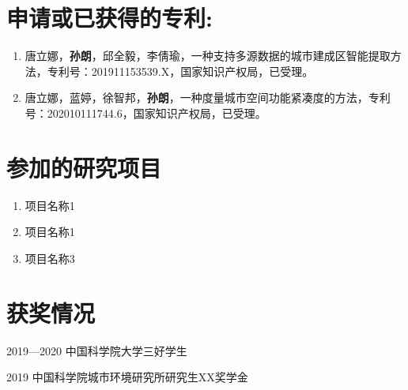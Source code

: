 \section*{申请或已获得的专利:}

{
\setlist[enumerate]{}%
\begin{enumerate}[nosep]
    \item 唐立娜，\textbf{孙朗}，邱全毅，李倩瑜，一种支持多源数据的城市建成区智能提取方法，专利号：201911153539.X，国家知识产权局，已受理。
    \item 唐立娜，蓝婷，徐智邦，\textbf{孙朗}，一种度量城市空间功能紧凑度的方法，专利号：202010111744.6，国家知识产权局，已受理。
\end{enumerate}
}

\section*{参加的研究项目}

{
\setlist[enumerate]{}%
\begin{enumerate}[nosep]
    \item 项目名称1

    \item 项目名称1

    \item 项目名称3

\end{enumerate}
}

\section*{获奖情况}
    2019—2020 \quad 中国科学院大学三好学生

    2019 \qquad \qquad 中国科学院城市环境研究所研究生XX奖学金



\cleardoublepage[plain]%
